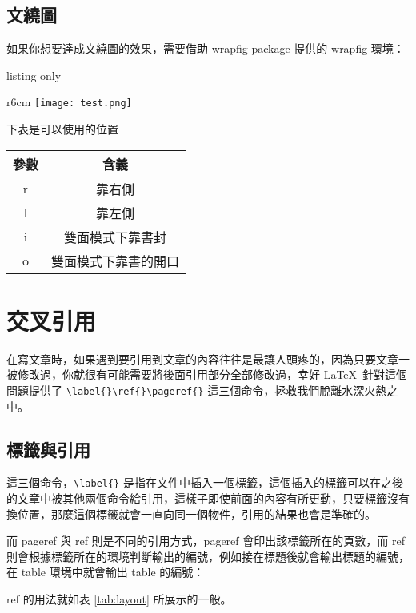 \subsection{文繞圖}

如果你想要達成文繞圖的效果，需要借助 wrapfig package 提供的 wrapfig 環境：

\begin{tcblisting}{listing only}
\begin{wrapfigure}{r}{6cm}
\texttt{[image: test.png]}
\end{wrapfigure}
\end{tcblisting}

下表是可以使用的位置

\begin{tabular}{cc}
\hline
參數 & 含義 \\\hline\hline
 r  & 靠右側 \\\hline
 l  & 靠左側 \\\hline
 i  & 雙面模式下靠書封 \\\hline
 o  & 雙面模式下靠書的開口 \\\hline
\end{tabular}

\section{交叉引用}

在寫文章時，如果遇到要引用到文章的內容往往是最讓人頭疼的，因為只要文章一被修改過，你就很有可能需要將後面引用部分全部修改過，幸好 \LaTeX\ 針對這個問題提供了 \verb|\label{}\ref{}\pageref{}| 這三個命令，拯救我們脫離水深火熱之中。

\subsection{標籤與引用}

這三個命令，\verb`\label{}` 是指在文件中插入一個標籤，這個插入的標籤可以在之後的文章中被其他兩個命令給引用，這樣子即使前面的內容有所更動，只要標籤沒有換位置，那麼這個標籤就會一直向同一個物件，引用的結果也會是準確的。

而 pageref 與 ref 則是不同的引用方式，pageref 會印出該標籤所在的頁數，而 ref 則會根據標籤所在的環境判斷輸出的編號，例如接在標題後就會輸出標題的編號，在 table 環境中就會輸出 table 的編號：

\begin{tcblisting}{}
ref 的用法就如表 \ref{tab:layout} 所展示的一般。
\end{tcblisting}

